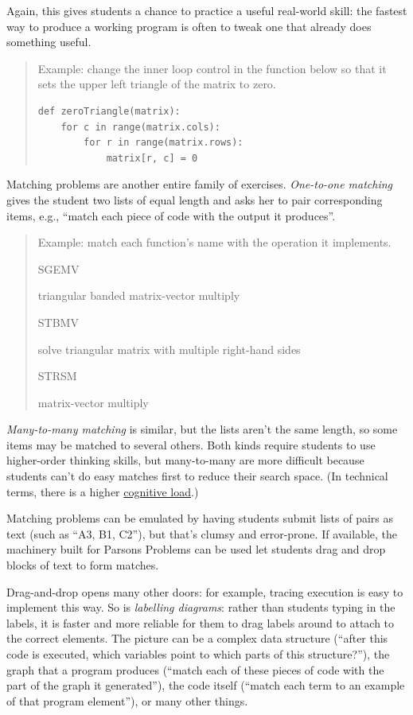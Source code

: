 \documentclass[10pt,statementpaper]{memoir}
\begin{document}
Again, this gives students a chance to practice a useful real-world
skill: the fastest way to produce a working program is often to tweak
one that already does something useful.

\begin{quote}
Example: change the inner loop control in the function below so that it
sets the upper left triangle of the matrix to zero.

\begin{verbatim}
def zeroTriangle(matrix):
    for c in range(matrix.cols):
        for r in range(matrix.rows):
            matrix[r, c] = 0
\end{verbatim}
\end{quote}

Matching problems are another entire family of exercises.
\emph{One-to-one matching} gives the student two lists of equal length
and asks her to pair corresponding items, e.g., ``match each piece of
code with the output it produces''.

\begin{quote}
Example: match each function's name with the operation it implements.

SGEMV

triangular banded matrix-vector multiply

STBMV

solve triangular matrix with multiple right-hand sides

STRSM

matrix-vector multiply
\end{quote}

\emph{Many-to-many matching} is similar, but the lists aren't the same
length, so some items may be matched to several others. Both kinds
require students to use higher-order thinking skills, but many-to-many
are more difficult because students can't do easy matches first to
reduce their search space. (In technical terms, there is a higher
\href{load.html}{cognitive load}.)

Matching problems can be emulated by having students submit lists of
pairs as text (such as ``A3, B1, C2''), but that's clumsy and
error-prone. If available, the machinery built for Parsons Problems can
be used let students drag and drop blocks of text to form matches.

Drag-and-drop opens many other doors: for example, tracing execution is
easy to implement this way. So is \emph{labelling diagrams}: rather than
students typing in the labels, it is faster and more reliable for them
to drag labels around to attach to the correct elements. The picture can
be a complex data structure (``after this code is executed, which
variables point to which parts of this structure?''), the graph that a
program produces (``match each of these pieces of code with the part of
the graph it generated''), the code itself (``match each term to an
example of that program element''), or many other things.
\end{document}
